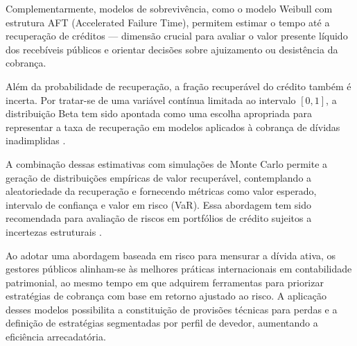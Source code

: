 \documentclass[a4paper,12pt]{article}
\begin{document}
Complementarmente, modelos de sobrevivência, como o modelo Weibull com estrutura AFT (Accelerated Failure Time), permitem estimar o tempo até a recuperação de créditos — dimensão crucial para avaliar o valor presente líquido dos recebíveis públicos e orientar decisões sobre ajuizamento ou desistência da cobrança.

Além da probabilidade de recuperação, a fração recuperável do crédito também é incerta. Por tratar-se de uma variável contínua limitada ao intervalo $[0,1]$, a distribuição Beta tem sido apontada como uma escolha apropriada para representar a taxa de recuperação em modelos aplicados à cobrança de dívidas inadimplidas \cite{kovalenko2021}.

A combinação dessas estimativas com simulações de Monte Carlo permite a geração de distribuições empíricas de valor recuperável, contemplando a aleatoriedade da recuperação e fornecendo métricas como valor esperado, intervalo de confiança e valor em risco (VaR). Essa abordagem tem sido recomendada para avaliação de riscos em portfólios de crédito sujeitos a incertezas estruturais \cite{zogovic2018}.

Ao adotar uma abordagem baseada em risco para mensurar a dívida ativa, os gestores públicos alinham-se às melhores práticas internacionais em contabilidade patrimonial, ao mesmo tempo em que adquirem ferramentas para priorizar estratégias de cobrança com base em retorno ajustado ao risco. A aplicação desses modelos possibilita a constituição de provisões técnicas para perdas e a definição de estratégias segmentadas por perfil de devedor, aumentando a eficiência arrecadatória.



\newpage


\end{document}

